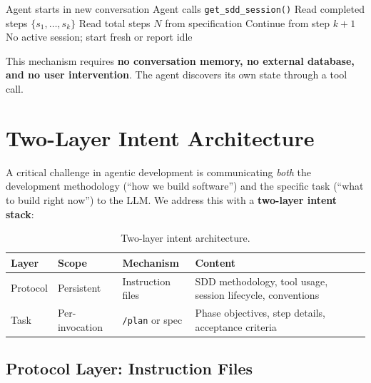 \documentclass[11pt,letterpaper]{article}
\begin{document}
\begin{algorithm}
\caption{Cross-conversation resume protocol}
\label{alg:resume}
\begin{algorithmic}[1]
\STATE Agent starts in new conversation
\STATE Agent calls \texttt{get\_sdd\_session()}
    \STATE Read completed steps $\{s_1, \ldots, s_k\}$
    \STATE Read total steps $N$ from specification
    \STATE Continue from step $k+1$
\ELSE
    \STATE No active session; start fresh or report idle
\ENDIF
\end{algorithmic}
\end{algorithm}

This mechanism requires \textbf{no conversation memory, no external
database, and no user intervention}.  The agent discovers its own
state through a tool call.

\section{Two-Layer Intent Architecture}
\label{sec:intent}

A critical challenge in agentic development is communicating \emph{both}
the development methodology (``how we build software'') and the specific
task (``what to build right now'') to the LLM.  We address this with a
\textbf{two-layer intent stack}:

\begin{table}[h]
\centering
\caption{Two-layer intent architecture.}
\label{tab:intent}
\begin{tabular}{@{}lllp{4.5cm}@{}}
\toprule
\textbf{Layer} & \textbf{Scope} & \textbf{Mechanism} & \textbf{Content} \\
\midrule
Protocol & Persistent & Instruction files & SDD methodology, tool usage,
    session lifecycle, conventions \\
Task     & Per-invocation & \texttt{/plan} or spec & Phase objectives,
    step details, acceptance criteria \\
\bottomrule
\end{tabular}
\end{table}

\subsection{Protocol Layer: Instruction Files}
\end{document}
